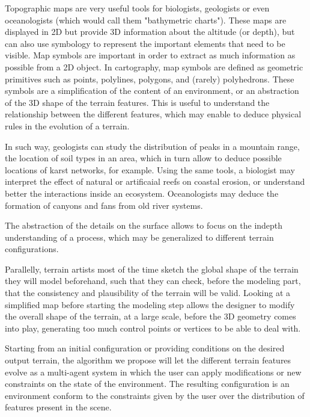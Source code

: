 Topographic maps are very useful tools for biologists, geologists or even oceanologists (which would call them "bathymetric charts"). These maps are displayed in 2D but provide 3D information about the altitude (or depth), but can also use symbology to represent the important elements that need to be visible. Map symbols are important in order to extract as much information as possible from a 2D object. In cartography, map symbols are defined as geometric primitives such as points, polylines, polygons, and (rarely) polyhedrons. These symbols are a simplification of the content of an environment, or an abstraction of the 3D shape of the terrain features. This is useful to understand the relationship between the different features, which may enable to deduce physical rules in the evolution of a terrain. 

In such way, geologists can study the distribution of peaks in a mountain range, the location of soil types in an area, which in turn allow to deduce possible locations of karst networks, for example. Using the same tools, a biologist may interpret the effect of natural or artificaial reefs on coastal erosion, or understand better the interactions inside an ecosystem. Oceanologists may deduce the formation of canyons and fans from old river systems.

The abstraction of the details on the surface allows to focus on the indepth understanding of a process, which may be generalized to different terrain configurations. 

Parallelly, terrain artists most of the time sketch the global shape of the terrain they will model beforehand, such that they can check, before the modeling part, that the consistency and plausibility of the terrain will be valid. Looking at a simplified map before starting the modeling step allows the designer to modify the overall shape of the terrain, at a large scale, before the 3D geometry comes into play, generating too much control points or vertices to be able to deal with.

Starting from an initial configuration or providing conditions on the desired output terrain, the algorithm we propose will let the different terrain features evolve as a multi-agent system in which the user can apply modifications or new constraints on the state of the environment. The resulting configuration is an environment conform to the constraints given by the user over the distribution of features present in the scene.

